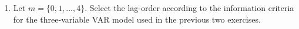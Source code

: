 \begin{enumerate}
\begin{solution}
          \end{solution}
    \item Let $m=\{0,1,...,4\}$. Select the lag-order according to the information criteria for the three-variable VAR model used in the previous two exercises.
          \begin{solution}
          \end{solution}
\end{enumerate}
